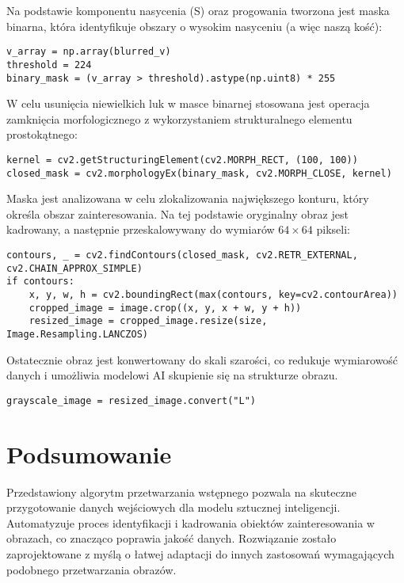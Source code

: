 Na podstawie komponentu nasycenia (S) oraz progowania tworzona jest maska binarna, która identyfikuje obszary o wysokim nasyceniu (a więc naszą kość):

\begin{verbatim}
v_array = np.array(blurred_v)
threshold = 224
binary_mask = (v_array > threshold).astype(np.uint8) * 255
\end{verbatim}

W celu usunięcia niewielkich luk w masce binarnej stosowana jest operacja zamknięcia morfologicznego z wykorzystaniem strukturalnego elementu prostokątnego:

\begin{verbatim}
kernel = cv2.getStructuringElement(cv2.MORPH_RECT, (100, 100))
closed_mask = cv2.morphologyEx(binary_mask, cv2.MORPH_CLOSE, kernel)
\end{verbatim}

Maska jest analizowana w celu zlokalizowania największego konturu, który określa obszar zainteresowania. Na tej podstawie oryginalny obraz jest kadrowany, a następnie przeskalowywany do wymiarów $64 \times 64$ pikseli:

\begin{verbatim}
contours, _ = cv2.findContours(closed_mask, cv2.RETR_EXTERNAL, cv2.CHAIN_APPROX_SIMPLE)
if contours:
    x, y, w, h = cv2.boundingRect(max(contours, key=cv2.contourArea))
    cropped_image = image.crop((x, y, x + w, y + h))
    resized_image = cropped_image.resize(size, Image.Resampling.LANCZOS)
\end{verbatim}

Ostatecznie obraz jest konwertowany do skali szarości, co redukuje wymiarowość danych i umożliwia modelowi AI skupienie się na strukturze obrazu.

\begin{verbatim}
grayscale_image = resized_image.convert("L")
\end{verbatim}

\section{Podsumowanie}

Przedstawiony algorytm przetwarzania wstępnego pozwala na skuteczne przygotowanie danych wejściowych dla modelu sztucznej inteligencji.
Automatyzuje proces identyfikacji i kadrowania obiektów zainteresowania w obrazach, co znacząco poprawia jakość danych.
Rozwiązanie zostało zaprojektowane z myślą o łatwej adaptacji do innych zastosowań wymagających podobnego przetwarzania obrazów.

